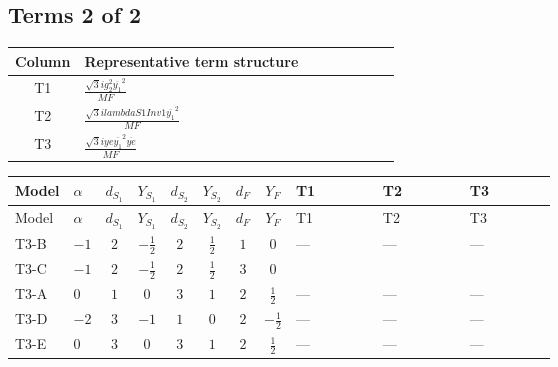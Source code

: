 \documentclass[8pt]{article}
\begin{document}
\begin{landscape}
\subsection*{Terms 2 of 2}
\begin{center}
\begin{tabular}{@{}c >{\raggedright\arraybackslash}p{0.82\linewidth}@{}}
\toprule
Column & Representative term structure \\
\midrule
T1 & \(\displaystyle \frac{\sqrt{3} i g_{2}^{2} \overline{y_{1}}^{2}}{MF}\) \\
\midrule
T2 & \(\displaystyle \frac{\sqrt{3} i lambdaS1Inv1 \overline{y_{1}}^{2}}{MF}\) \\
\midrule
T3 & \(\displaystyle \frac{\sqrt{3} i ye \overline{y_{1}}^{2} \overline{ye}}{MF}\) \\
\midrule
\bottomrule
\end{tabular}
\end{center}
\smallskip
\tiny
\begin{longtable}{@{}llcccccc >{\raggedright\arraybackslash}p{0.21\linewidth} >{\raggedright\arraybackslash}p{0.21\linewidth} >{\raggedright\arraybackslash}p{0.21\linewidth}@{}}
\toprule
Model & $\alpha$ & $d_{S_1}$ & $Y_{S_1}$ & $d_{S_2}$ & $Y_{S_2}$ & $d_F$ & $Y_F$ & T1 & T2 & T3 \\
\midrule
\endfirsthead
\toprule
Model & $\alpha$ & $d_{S_1}$ & $Y_{S_1}$ & $d_{S_2}$ & $Y_{S_2}$ & $d_F$ & $Y_F$ & T1 & T2 & T3 \\
\midrule
\endhead
T3-B & $-1$ & $2$ & $-\frac{1}{2}$ & $2$ & $\frac{1}{2}$ & $1$ & $0$ & --- & --- & --- \\
\midrule
T3-C & $-1$ & $2$ & $-\frac{1}{2}$ & $2$ & $\frac{1}{2}$ & $3$ & $0$ & \scriptsize\adjustbox{max width=\linewidth}{$\begin{gathered} \frac{\sqrt{3} i g_{2}^{2} \overline{y_{1}}^{2}}{4 MF}\end{gathered}$} & \scriptsize\adjustbox{max width=\linewidth}{$\begin{gathered} \frac{\sqrt{3} i lambdaS1Inv1 \overline{y_{1}}^{2}}{6 MF}\end{gathered}$} & \scriptsize\adjustbox{max width=\linewidth}{$\begin{gathered} - \frac{\sqrt{3} i ye \overline{y_{1}}^{2} \overline{ye}}{12 MF}\end{gathered}$} \\
\midrule
T3-A & $0$ & $1$ & $0$ & $3$ & $1$ & $2$ & $\frac{1}{2}$ & --- & --- & --- \\
\midrule
T3-D & $-2$ & $3$ & $-1$ & $1$ & $0$ & $2$ & $-\frac{1}{2}$ & --- & --- & --- \\
\midrule
T3-E & $0$ & $3$ & $0$ & $3$ & $1$ & $2$ & $\frac{1}{2}$ & --- & --- & --- \\
\midrule
\bottomrule
\end{longtable}
\clearpage

\end{landscape}
\end{document}
